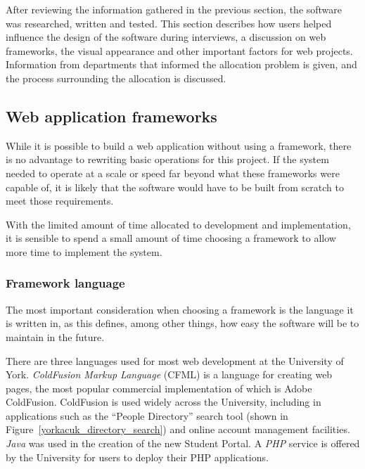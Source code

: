 \documentclass[twoside,draft]{scrartcl}
\begin{document}
After reviewing the information gathered in the previous section, the software
was researched, written and tested. This section describes how users helped
influence the design of the software during interviews, a discussion on web
frameworks, the visual appearance and other important factors for web
projects. Information from departments that informed the allocation problem is
given, and the process surrounding the allocation is discussed.





\subsection{Web application frameworks}
\label{sec:webframeworks}


While it is possible to build a web application without using a framework,
there is no advantage to rewriting basic operations for this project. If the
system needed to operate at a scale or speed far beyond what these frameworks
were capable of, it is likely that the software would have to be built from
scratch to meet those requirements.

With the limited amount of time allocated to development and implementation,
it is sensible to spend a small amount of time choosing a framework to allow
more time to implement the system.


\subsubsection{Framework language}


The most important consideration when choosing a framework is the language it
is written in, as this defines, among other things, how easy the software will
be to maintain in the future.


There are three languages used for most web development at the University of
York. \emph{ColdFusion Markup Language} (CFML) is a language for creating web pages,
the most popular commercial implementation of which is Adobe ColdFusion.
ColdFusion is used widely across the University, including in applications
such as the ``People Directory'' search tool (shown in
Figure~\ref{yorkacuk_directory_search}) and online account management
facilities. \emph{Java} was used in the creation of the new Student Portal. A
\emph{PHP} service is offered by the University for users to deploy their PHP
applications.
\end{document}
